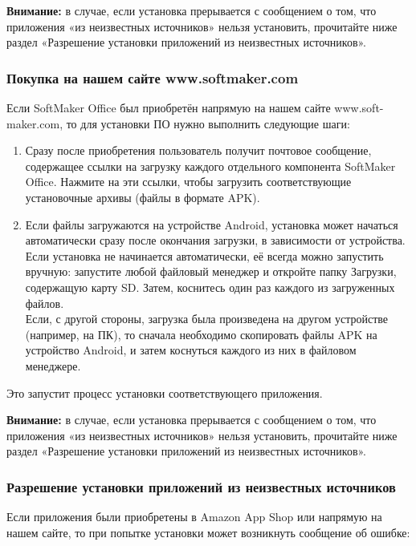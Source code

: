 ﻿\documentclass[a4paper,10pt]{article}
\begin{document}
\begin{mdframed}[backgroundcolor=blue!10]
\textbf{Внимание:} в случае, если установка прерывается с сообщением о том, что приложения «из неизвестных источников» нельзя установить, прочитайте ниже раздел «Разрешение установки приложений из неизвестных источников».
\end{mdframed}
\subsubsection{Покупка на нашем сайте www.softmaker.com}
Если SoftMaker Office был приобретён напрямую на нашем сайте www.soft-maker.com, то для установки ПО нужно выполнить следующие шаги:
\begin{enumerate}
 \item Сразу после приобретения пользователь получит почтовое сообщение, содержащее ссылки на загрузку каждого отдельного компонента SoftMaker Office. Нажмите на эти ссылки, чтобы загрузить соответствующие установочные архивы (файлы в формате APK).
 \item Если файлы загружаются на устройстве Android, установка может начаться автоматически сразу после окончания загрузки, в зависимости от устройства. Если установка не начинается автоматически, её всегда можно запустить вручную: запустите любой файловый менеджер и откройте папку Загрузки, содержащую карту SD. Затем, коснитесь один раз каждого из загруженных файлов.\\
 Если, с другой стороны, загрузка была произведена на другом устройстве (например, на ПК), то сначала необходимо скопировать файлы APK на устройство Android, и затем коснуться каждого из них в файловом менеджере.
\end{enumerate}
Это запустит процесс установки соответствующего приложения.

\begin{mdframed}[backgroundcolor=blue!10]
\textbf{Внимание:} в случае, если установка прерывается с сообщением о том, что приложения «из неизвестных источников» нельзя установить, прочитайте ниже раздел «Разрешение установки приложений из неизвестных источников».
\end{mdframed}

\subsubsection{Разрешение установки приложений из неизвестных источников}
Если приложения были приобретены в Amazon App Shop или напрямую на нашем сайте, то при попытке установки может возникнуть сообщение об ошибке:
\end{document}
